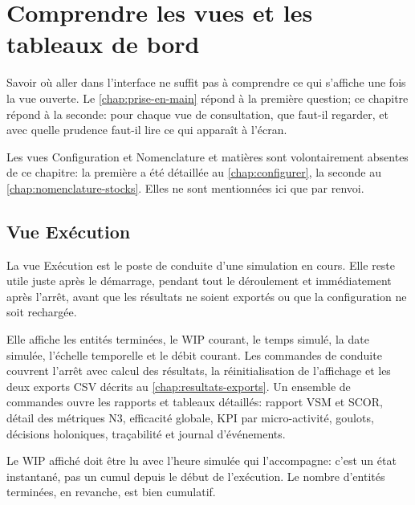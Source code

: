 \chapter{Comprendre les vues et les tableaux de bord}
\label{chap:vues-tableaux}

Savoir où aller dans l'interface ne suffit pas à comprendre ce qui s'affiche une fois la vue ouverte. Le \cref{chap:prise-en-main} répond à la première question; ce chapitre répond à la seconde: pour chaque vue de consultation, que faut-il regarder, et avec quelle prudence faut-il lire ce qui apparaît à l'écran.

Les vues Configuration et Nomenclature et matières sont volontairement absentes de ce chapitre: la première a été détaillée au \cref{chap:configurer}, la seconde au \cref{chap:nomenclature-stocks}. Elles ne sont mentionnées ici que par renvoi.

\section{Vue Exécution}

La vue Exécution est le poste de conduite d'une simulation en cours. Elle reste utile juste après le démarrage, pendant tout le déroulement et immédiatement après l'arrêt, avant que les résultats ne soient exportés ou que la configuration ne soit rechargée.


Elle affiche les entités terminées, le WIP courant, le temps simulé, la date simulée, l'échelle temporelle et le débit courant. Les commandes de conduite couvrent l'arrêt avec calcul des résultats, la réinitialisation de l'affichage et les deux exports CSV décrits au \cref{chap:resultats-exports}. Un ensemble de commandes ouvre les rapports et tableaux détaillés: rapport VSM et SCOR, détail des métriques N3, efficacité globale, KPI par micro-activité, goulots, décisions holoniques, traçabilité et journal d'événements.


Le WIP affiché doit être lu avec l'heure simulée qui l'accompagne: c'est un état instantané, pas un cumul depuis le début de l'exécution. Le nombre d'entités terminées, en revanche, est bien cumulatif.


